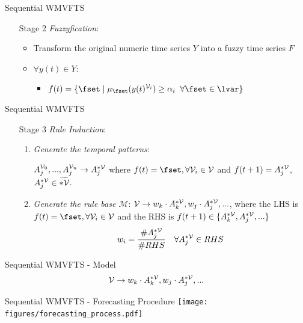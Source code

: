 \documentclass{beamer}
\begin{document}
\begin{frame}{Sequential WMVFTS }
\linespread{2}
\begin{enumerate}
\item[Stage 2] \textit{Fuzzyfication}: 
\begin{itemize}
    \item Transform the original numeric time series $Y$ into a fuzzy time series $F$
    \item $\forall y(t) \in Y$:
    \begin{itemize}
    \item $f(t) = \{\fset\; |\; \mu_{\fset}(y(t)^{\vari}) \geq \alpha_i\;\;\forall \fset \in \lvar\}$
    \end{itemize}
\end{itemize}
\end{enumerate}
\end{frame}

\begin{frame}{Sequential WMVFTS }
\linespread{1}
\begin{enumerate}
\item[Stage 3] \textit{Rule Induction}: 
\begin{enumerate}
\item \textit{Generate the temporal patterns}:  

$A_j^{\mathcal{V}_0},...,A_j^{\mathcal{V}_n} \rightarrow A_j^{*\mathcal{V}}$
where $f(t) = \fset, \forall \vari \in \var$ and $f(t+1) = A_j^{*\mathcal{V}}$, $A_j^{*\mathcal{V}} \in \widetilde{*\mathcal{V}}$.

\item \textit{Generate the rule base $\mathcal{M}$}: 
$\mathcal{V} \rightarrow w_k \cdot A_k^{*\mathcal{V}}, w_j \cdot A_j^{*\mathcal{V}},...$, where the LHS is $f(t) = \fset, \forall \vari \in \var$ and the RHS is $f(t+1) \in \{A_k^{*\mathcal{V}},A_j^{*\mathcal{V}},... \}$ 
\begin{equation}
w_i = \frac{\#A_j^{*\mathcal{V}}}{\#RHS} \quad \forall A_j^{*\mathcal{V}} \in RHS    
\end{equation}
\end{enumerate}
\end{enumerate}
\end{frame}

\begin{frame}{Sequential WMVFTS - Model}
$$
\mathcal{V} \rightarrow w_k \cdot A_k^{*\mathcal{V}}, w_j \cdot A_j^{*\mathcal{V}},...
$$
\end{frame}


\begin{frame}{Sequential WMVFTS - Forecasting Procedure}
\centering
\texttt{[image: figures/forecasting\_process.pdf]}
\end{frame}
\end{document}
